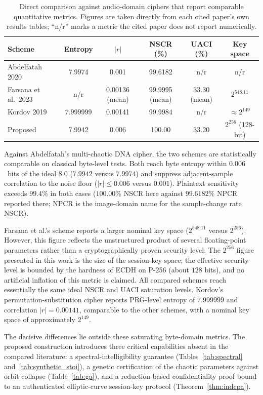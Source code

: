 \documentclass[pdflatex,sn-mathphys-num]{sn-jnl}%
\theoremstyle{thmstyleone}%
\theoremstyle{thmstyletwo}%
\theoremstyle{thmstylethree}%
\begin{document}
\begin{table}[htbp]
\centering
\caption{Direct comparison against audio-domain ciphers that report comparable quantitative metrics. Figures are taken directly from each cited paper's own results tables; ``n/r'' marks a metric the cited paper does not report numerically.}
\label{tab:compare}
\small
\begin{tabular}{lccccc}
\toprule
\textbf{Scheme} & \textbf{Entropy} & \textbf{$|r|$} & \textbf{NSCR (\%)} & \textbf{UACI (\%)} & \textbf{Key space} \\
\midrule
Abdelfatah 2020~\cite{abdelfatah2020} & 7.9974 & 0.001 & 99.6182 & n/r & n/r \\
Farsana et al.\ 2023~\cite{farsana2021} & n/r & 0.00136 (mean) & 99.9995 (mean) & 33.30 (mean) & $2^{548.11}$ \\
Kordov 2019~\cite{kordov2021} & 7.999999 & 0.00141 & 99.9984 & n/r & $\approx 2^{149}$ \\
Proposed & 7.9942 & 0.006 & 100.00 & 33.20 & $2^{256}$ (128-bit) \\
\bottomrule
\end{tabular}
\end{table}

Against Abdelfatah's multi-chaotic DNA cipher, the two schemes are statistically comparable on classical byte-level tests. Both reach byte entropy within $0.006$~bits of the ideal $8.0$ ($7.9942$ versus $7.9974$) and suppress adjacent-sample correlation to the noise floor ($|r|\le0.006$ versus $0.001$). Plaintext sensitivity exceeds $99.4\%$ in both cases ($100.00\%$ NSCR here against $99.6182\%$ NPCR reported there; NPCR is the image-domain name for the sample-change rate NSCR).

Farsana et al.'s scheme reports a larger nominal key space ($2^{548.11}$ versus $2^{256}$). However, this figure reflects the unstructured product of several floating-point parameters rather than a cryptographically proven security level. The $2^{256}$ figure presented in this work is the size of the session-key space; the effective security level is bounded by the hardness of ECDH on P-256 (about $128$ bits), and no artificial inflation of this metric is claimed. All compared schemes reach essentially the same ideal NSCR and UACI saturation levels. Kordov's permutation-substitution cipher reports PRG-level entropy of $7.999999$ and correlation $|r|=0.00141$, comparable to the other schemes, with a nominal key space of approximately $2^{149}$.

The decisive differences lie outside these saturating byte-domain metrics. The proposed construction introduces three critical capabilities absent in the compared literature: a spectral-intelligibility guarantee (Tables~\ref{tab:spectral} and~\ref{tab:synthetic_stoi}), a genetic certification of the chaotic parameters against orbit collapse (Table~\ref{tab:ga}), and a reduction-based confidentiality proof bound to an authenticated elliptic-curve session-key protocol (Theorem~\ref{thm:indcpa}).
\end{document}

